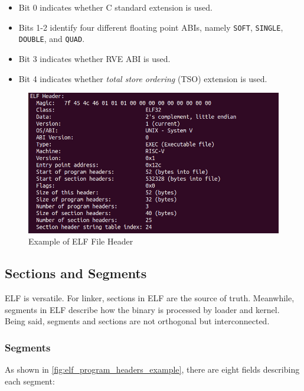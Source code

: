 \begin{itemize}
    \item Bit 0 indicates whether C standard extension is used.
    \item Bits 1-2 identify four different floating point ABIs, namely \texttt{SOFT}, \texttt{SINGLE}, \texttt{DOUBLE}, and \texttt{QUAD}.
    \item Bit 3 indicates whether RVE ABI is used.
    \item Bit 4 indicates whether \textit{total store ordering} (TSO) extension is used.
\end{itemize}

\begin{figure}
    \centering
    \includegraphics[width=.85\linewidth]{figures/ELF_Header.png}
    \caption{Example of \ac{ELF} File Header}
    \label{fig:elf_header_example}
\end{figure}

\subsection{Sections and Segments}
\ac{ELF} is versatile. For linker, sections in ELF are the source of truth. Meanwhile, segments in \ac{ELF} describe how the binary is processed by loader and kernel. Being said, segments and sections are not orthogonal but interconnected. 

\subsubsection{Segments}
As shown in \cref{fig:elf_program_headers_example}, there are eight fields describing each segment:

